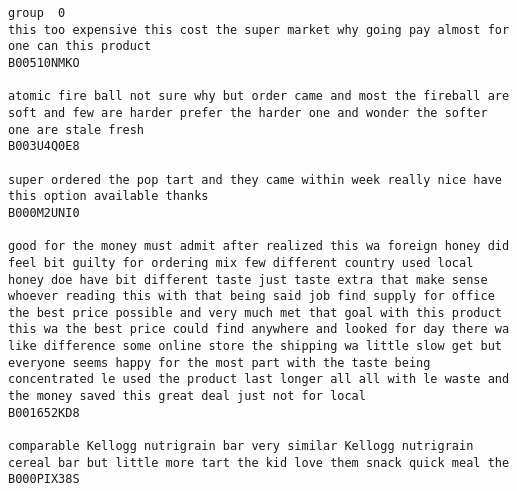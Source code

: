 \documentclass[11pt]{article}
\begin{document}
    \begin{Verbatim}[commandchars=\\\{\}]
group  0
this too expensive this cost the super market why going pay almost for one can this product
B00510NMKO

atomic fire ball not sure why but order came and most the fireball are soft and few are harder prefer the harder one and wonder the softer one are stale fresh
B003U4Q0E8

super ordered the pop tart and they came within week really nice have this option available thanks
B000M2UNI0

good for the money must admit after realized this wa foreign honey did feel bit guilty for ordering mix few different country used local honey doe have bit different taste just taste extra that make sense whoever reading this with that being said job find supply for office the best price possible and very much met that goal with this product this wa the best price could find anywhere and looked for day there wa like difference some online store the shipping wa little slow get but everyone seems happy for the most part with the taste being concentrated le used the product last longer all all with le waste and the money saved this great deal just not for local
B001652KD8

comparable Kellogg nutrigrain bar very similar Kellogg nutrigrain cereal bar but little more tart the kid love them snack quick meal the
B000PIX38S


\end{Verbatim}
\end{document}
